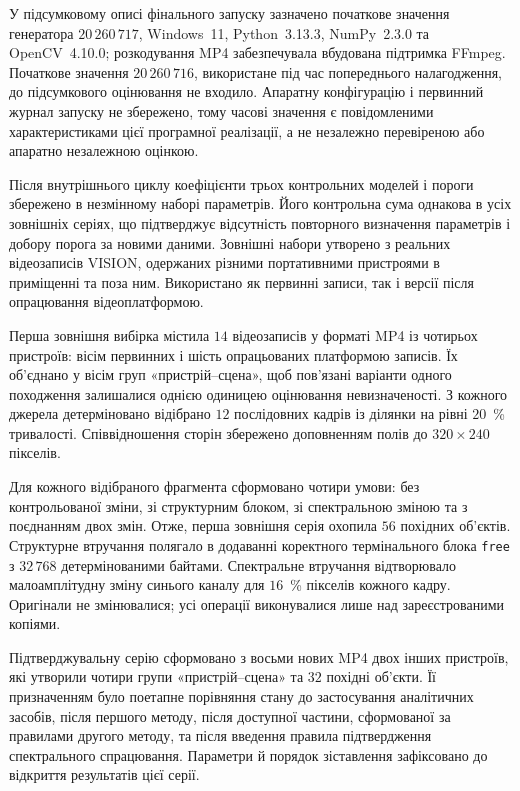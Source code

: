 У підсумковому описі фінального запуску зазначено початкове значення генератора $20\,260\,717$, Windows~11, Python~3.13.3, NumPy~2.3.0 та OpenCV~4.10.0; розкодування MP4 забезпечувала вбудована підтримка FFmpeg. Початкове значення $20\,260\,716$, використане під час попереднього налагодження, до підсумкового оцінювання не входило. Апаратну конфігурацію і первинний журнал запуску не збережено, тому часові значення є повідомленими характеристиками цієї програмної реалізації, а не незалежно перевіреною або апаратно незалежною оцінкою.

Після внутрішнього циклу коефіцієнти трьох контрольних моделей і пороги збережено в незмінному наборі параметрів. Його контрольна сума однакова в усіх зовнішніх серіях, що підтверджує відсутність повторного визначення параметрів і добору порога за новими даними. Зовнішні набори утворено з реальних відеозаписів VISION, одержаних різними портативними пристроями в приміщенні та поза ним. Використано як первинні записи, так і версії після опрацювання відеоплатформою.

Перша зовнішня вибірка містила $14$ відеозаписів у форматі MP4 із чотирьох пристроїв: вісім первинних і шість опрацьованих платформою записів. Їх об’єднано у вісім груп «пристрій--сцена», щоб пов’язані варіанти одного походження залишалися однією одиницею оцінювання невизначеності. З кожного джерела детерміновано відібрано $12$ послідовних кадрів із ділянки на рівні $20$~\% тривалості. Співвідношення сторін збережено доповненням полів до $320\times240$ пікселів.

Для кожного відібраного фрагмента сформовано чотири умови: без контрольованої зміни, зі структурним блоком, зі спектральною зміною та з поєднанням двох змін. Отже, перша зовнішня серія охопила $56$ похідних об’єктів. Структурне втручання полягало в додаванні коректного термінального блока \texttt{free} з $32\,768$ детермінованими байтами. Спектральне втручання відтворювало малоамплітудну зміну синього каналу для $16$~\% пікселів кожного кадру. Оригінали не змінювалися; усі операції виконувалися лише над зареєстрованими копіями.

Підтверджувальну серію сформовано з восьми нових MP4 двох інших пристроїв, які утворили чотири групи «пристрій--сцена» та $32$ похідні об’єкти. Її призначенням було поетапне порівняння стану до застосування аналітичних засобів, після першого методу, після доступної частини, сформованої за правилами другого методу, та після введення правила підтвердження спектрального спрацювання. Параметри й порядок зіставлення зафіксовано до відкриття результатів цієї серії.

